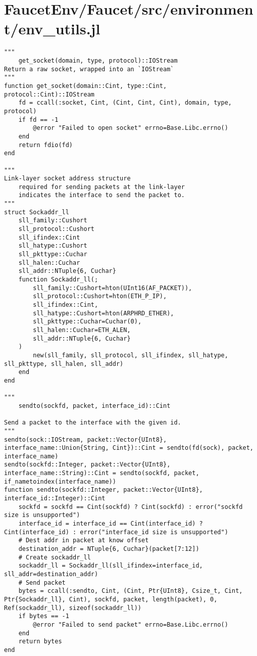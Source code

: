 \section{FaucetEnv/Faucet/src/environment/env\_utils.jl}
\begin{lstlisting}[language=JuliaLocal, style=julia]
"""
    get_socket(domain, type, protocol)::IOStream
Return a raw socket, wrapped into an `IOStream`
"""
function get_socket(domain::Cint, type::Cint, protocol::Cint)::IOStream
    fd = ccall(:socket, Cint, (Cint, Cint, Cint), domain, type, protocol)
    if fd == -1
        @error "Failed to open socket" errno=Base.Libc.errno()
    end
    return fdio(fd)
end

"""
Link-layer socket address structure
    required for sending packets at the link-layer
    indicates the interface to send the packet to.
"""
struct Sockaddr_ll
    sll_family::Cushort
    sll_protocol::Cushort
    sll_ifindex::Cint
    sll_hatype::Cushort
    sll_pkttype::Cuchar
    sll_halen::Cuchar
    sll_addr::NTuple{6, Cuchar}
    function Sockaddr_ll(;
        sll_family::Cushort=hton(UInt16(AF_PACKET)),
        sll_protocol::Cushort=hton(ETH_P_IP),
        sll_ifindex::Cint,
        sll_hatype::Cushort=hton(ARPHRD_ETHER),
        sll_pkttype::Cuchar=Cuchar(0),
        sll_halen::Cuchar=ETH_ALEN,
        sll_addr::NTuple{6, Cuchar}
    )
        new(sll_family, sll_protocol, sll_ifindex, sll_hatype, sll_pkttype, sll_halen, sll_addr)
    end
end

"""
    sendto(sockfd, packet, interface_id)::Cint

Send a packet to the interface with the given id.
"""
sendto(sock::IOStream, packet::Vector{UInt8}, interface_name::Union{String, Cint})::Cint = sendto(fd(sock), packet, interface_name)
sendto(sockfd::Integer, packet::Vector{UInt8}, interface_name::String)::Cint = sendto(sockfd, packet, if_nametoindex(interface_name))
function sendto(sockfd::Integer, packet::Vector{UInt8}, interface_id::Integer)::Cint
    sockfd = sockfd == Cint(sockfd) ? Cint(sockfd) : error("sockfd size is unsupported")
    interface_id = interface_id == Cint(interface_id) ? Cint(interface_id) : error("interface_id size is unsupported")
    # Dest addr in packet at know offset
    destination_addr = NTuple{6, Cuchar}(packet[7:12])
    # Create sockaddr_ll
    sockaddr_ll = Sockaddr_ll(sll_ifindex=interface_id, sll_addr=destination_addr)
    # Send packet
    bytes = ccall(:sendto, Cint, (Cint, Ptr{UInt8}, Csize_t, Cint, Ptr{Sockaddr_ll}, Cint), sockfd, packet, length(packet), 0, Ref(sockaddr_ll), sizeof(sockaddr_ll))
    if bytes == -1
        @error "Failed to send packet" errno=Base.Libc.errno()
    end
    return bytes
end


\end{lstlisting}
